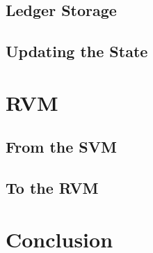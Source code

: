 \documentclass{article}
\begin{document}
\subsection{Ledger Storage}


\subsection{Updating the State}


\newpage
\section{RVM}



\subsection{From the SVM}



\subsection{To the RVM}





\newpage
\section*{Conclusion}






\end{document}
